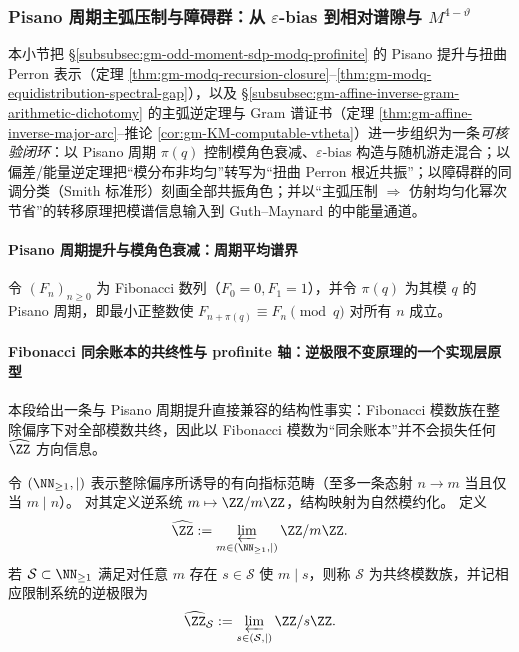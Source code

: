 \subsubsection{Pisano 周期主弧压制与障碍群：从 \texorpdfstring{$\varepsilon$}{epsilon}-bias 到相对谱隙与 \texorpdfstring{$M^{4-\vartheta}$}{M4-vtheta}}\label{subsubsec:gm-pisano-bias-obstruction-majorarc}
本小节把 \S\ref{subsubsec:gm-odd-moment-sdp-modq-profinite} 的 Pisano 提升与扭曲 Perron 表示（定理 \ref{thm:gm-modq-recursion-closure}--\ref{thm:gm-modq-equidistribution-spectral-gap}），以及 \S\ref{subsubsec:gm-affine-inverse-gram-arithmetic-dichotomy} 的主弧逆定理与 Gram 谱证书（定理 \ref{thm:gm-affine-inverse-major-arc}--推论 \ref{cor:gm-KM-computable-vtheta}）进一步组织为一条\emph{可核验闭环}：以 Pisano 周期 \(\pi(q)\) 控制模角色衰减、\(\varepsilon\)-bias 构造与随机游走混合；以偏差/能量逆定理把“模分布非均匀”转写为“扭曲 Perron 根近共振”；以障碍群的同调分类（Smith 标准形）刻画全部共振角色；并以“主弧压制 \(\Rightarrow\) 仿射均匀化幂次节省”的转移原理把模谱信息输入到 Guth--Maynard 的中能量通道。

\paragraph{Pisano 周期提升与模角色衰减：周期平均谱界}
令 \((F_n)_{n\ge 0}\) 为 Fibonacci 数列（\(F_0=0,F_1=1\)），并令 \(\pi(q)\) 为其模 \(q\) 的 Pisano 周期，即最小正整数使 \(F_{n+\pi(q)}\equiv F_n\pmod q\) 对所有 \(n\) 成立。

\paragraph{Fibonacci 同余账本的共终性与 profinite 轴：逆极限不变原理的一个实现层原型}
本段给出一条与 Pisano 周期提升直接兼容的结构性事实：Fibonacci 模数族在整除偏序下对全部模数共终，因此以 Fibonacci 模数为“同余账本”并不会损失任何 \(\widehat{\ZZ}\) 方向信息。

\begin{definition}\label{def:gm-profinite-and-cofinal-moduli}
令 \((\NN_{\ge 1},\mid)\) 表示整除偏序所诱导的有向指标范畴（至多一条态射 \(n\to m\) 当且仅当 \(m\mid n\)）。
对其定义逆系统
\(
m\mapsto \ZZ/m\ZZ
\)，结构映射为自然模约化。
定义
\[
\widehat{\ZZ}:=\varprojlim_{m\in(\NN_{\ge 1},\mid)}\ZZ/m\ZZ.
\]
若 \(\mathcal{S}\subset\NN_{\ge 1}\) 满足对任意 \(m\) 存在 \(s\in\mathcal{S}\) 使 \(m\mid s\)，则称 \(\mathcal{S}\) 为共终模数族，并记相应限制系统的逆极限为
\[
\widehat{\ZZ}_{\mathcal{S}}:=\varprojlim_{s\in(\mathcal{S},\mid)}\ZZ/s\ZZ.
\]
\end{definition}

